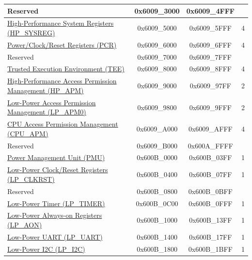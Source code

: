 \begin{ThreePartTable}
\begin{longtable}[c]{ |p{7cm}|c|c|r| }
        \rowcolor{gray!25}  Reserved                    & 0x6009\_3000 & 0x6009\_4FFF &         \\\hline
    \hyperref[mod:sysreg]{High-Performance System Registers (HP\_SYSREG)}               & 0x6009\_5000 & 0x6009\_5FFF &   4     \\\hline
    \hyperref[mod:resclk]{Power/Clock/Reset Registers (PCR)}                     & 0x6009\_6000 & 0x6009\_6FFF &   4     \\\hline
        \rowcolor{gray!25}  Reserved                    & 0x6009\_7000 & 0x6009\_7FFF &         \\\hline
    \hyperref[mod:permctrl]{Trusted Execution Environment (TEE)} \tnote{\textcolor{red}{2}}                     & 0x6009\_8000 & 0x6009\_8FFF &   4 \\\hline
    \hyperref[mod:permctrl]{High-Performance Access Permission Management (HP\_APM)}                      & 0x6009\_9000 & 0x6009\_97FF &   2 \\\hline
    \hyperref[mod:permctrl]{Low-Power Access Permission Management (LP\_APM0)}                      & 0x6009\_9800 & 0x6009\_9FFF &  2  \\\hline
    \hyperref[mod:permctrl]{CPU Access Permission Management (CPU\_APM)}                    & 0x6009\_A000 & 0x6009\_AFFF &    4     \\\hline    
        \rowcolor{gray!25}  Reserved                    & 0x6009\_B000 & 0x600A\_FFFF &         \\\hline
    \hyperref[mod:lowpowm]{Power Management Unit (PMU)} & 0x600B\_0000 & 0x600B\_03FF &   1     \\\hline
    \hyperref[mod:resclk]{Low-Power Clock/Reset Registers (LP\_CLKRST)}                  & 0x600B\_0400 & 0x600B\_07FF &   1     \\\hline
        \rowcolor{gray!25}  Reserved                    & 0x600B\_0800 & 0x600B\_0BFF &         \\\hline
    \hyperref[mod:lowpowm]{Low-Power Timer (LP\_TIMER)}                   & 0x600B\_0C00 & 0x600B\_0FFF &   1     \\\hline
    \hyperref[mod:sysreg]{Low-Power Always-on Registers (LP\_AON)}                     & 0x600B\_1000 & 0x600B\_13FF &   1     \\\hline
    \hyperref[mod:uart]{Low-Power UART (LP\_UART)}                    & 0x600B\_1400 & 0x600B\_17FF &   1     \\\hline
    \hyperref[mod:i2c]{Low-Power I2C (LP\_I2C)}                     & 0x600B\_1800 & 0x600B\_1BFF &   1     \\\hline

\end{longtable}
\end{ThreePartTable}
